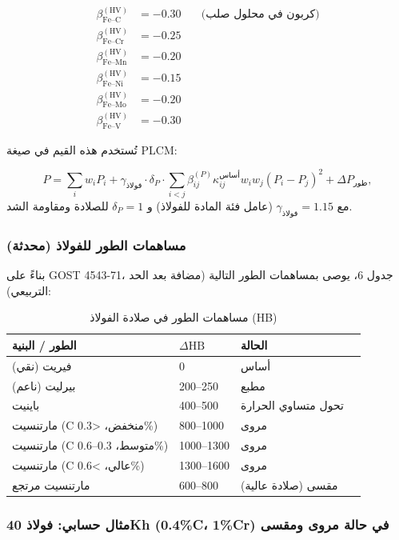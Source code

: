 \documentclass[12pt,a4paper]{article}
\begin{document}
	\[
	\begin{aligned}
		\beta_{\text{Fe–C}}^{(\text{HV})} &= -0.30 \quad &\text{(كربون في محلول صلب)} \\
		\beta_{\text{Fe–Cr}}^{(\text{HV})} &= -0.25 \\
		\beta_{\text{Fe–Mn}}^{(\text{HV})} &= -0.20 \\
		\beta_{\text{Fe–Ni}}^{(\text{HV})} &= -0.15 \\
		\beta_{\text{Fe–Mo}}^{(\text{HV})} &= -0.20 \\
		\beta_{\text{Fe–V}}^{(\text{HV})} &= -0.30
	\end{aligned}
	\]
	
	تُستخدم هذه القيم في صيغة PLCM:
	
	\[
	P = \sum_i w_i P_i + \gamma_{\text{فولاذ}} \cdot \delta_P \cdot \sum_{i<j} \beta_{ij}^{(P)} \kappa_{ij}^{\text{أساس}} w_i w_j (P_i - P_j)^2 + \Delta P_{\text{طور}},
	\]
	مع \(\gamma_{\text{فولاذ}} = 1.15\) (عامل فئة المادة للفولاذ) و \(\delta_P = 1\) للصلادة ومقاومة الشد.
	
	\subsubsection{مساهمات الطور للفولاذ (محدثة)}
	
	بناءً على GOST 4543-71، جدول 6، يوصى بمساهمات الطور التالية (مضافة بعد الحد التربيعي):
	
	\begin{longtable}{p{3.5cm} p{3.0cm} p{3.0cm} p{4cm}}
		\caption{مساهمات الطور في صلادة الفولاذ (HB)}\label{tab:steel_phase_contrib_gost4543}\\
		\toprule
		\textbf{الطور / البنية} & \(\Delta\text{HB}\) & \textbf{الحالة} \\
		\midrule
		فيريت (نقي) & 0 & أساس \\
		بيرليت (ناعم) & 200–250 & مطبع \\
		باينيت & 400–500 & تحول متساوي الحرارة \\
		مارتنسيت (C منخفض، <0.3\%) & 800–1000 & مروى \\
		مارتنسيت (C متوسط، 0.3–0.6\%) & 1000–1300 & مروى \\
		مارتنسيت (C عالي، >0.6\%) & 1300–1600 & مروى \\
		مارتنسيت مرتجع & 600–800 & مقسى (صلادة عالية) \\
		\bottomrule
	\end{longtable}
	
	\subsubsection{مثال حسابي: فولاذ 40Kh (0.4\%C، 1\%Cr) في حالة مروى ومقسى}
	
\end{document}
